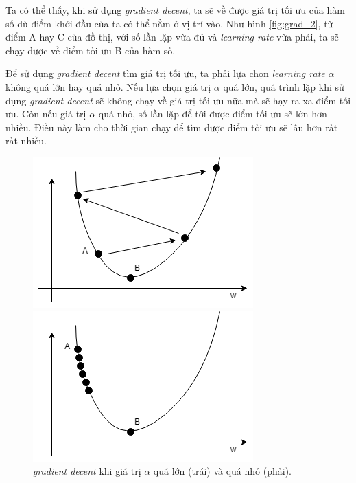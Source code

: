Ta có thể thấy, khi sử dụng \textit{gradient decent}, ta sẽ về được giá trị tối ưu của hàm số dù điểm khởi đầu của ta có thể nằm ở vị trí vào. Như hình \ref{fig:grad_2}, từ điểm A hay C của đồ thị, với số lần lặp vừa đủ và \textit{learning rate} vừa phải, ta sẽ chạy được về điểm tối ưu B của hàm số.

Để sử dụng \textit{gradient decent} tìm giá trị tối ưu, ta phải lựa chọn \textit{learning rate} $\alpha$ không quá lớn hay quá nhỏ. Nếu lựa chọn giá trị $\alpha$ quá lớn, quá trình lặp khi sử dụng \textit{gradient decent} sẽ không chạy về giá trị tối ưu nữa mà sẽ hạy ra xa điểm tối ưu. Còn nếu giá trị $\alpha$ quá nhỏ, số lần lặp để tới được điểm tối ưu sẽ lớn hơn nhiều. Điều này làm cho thời gian chạy để tìm được điểm tối ưu sẽ lâu hơn rất rất nhiều.

\clearpage
\begin{figure}[!htb]
   \begin{minipage}{0.48\textwidth}
     \centering
     \includegraphics[width=1\linewidth]{chapter02/figure/grad_3.png}
   \end{minipage}\hfill
   \begin{minipage}{0.48\textwidth}
     \centering
     \includegraphics[width=1\linewidth]{chapter02/figure/grad_4.png}
   \end{minipage}
   \caption{\textit{gradient decent} khi giá trị $\alpha$ quá lớn (trái) và quá nhỏ (phải).}
\end{figure}

